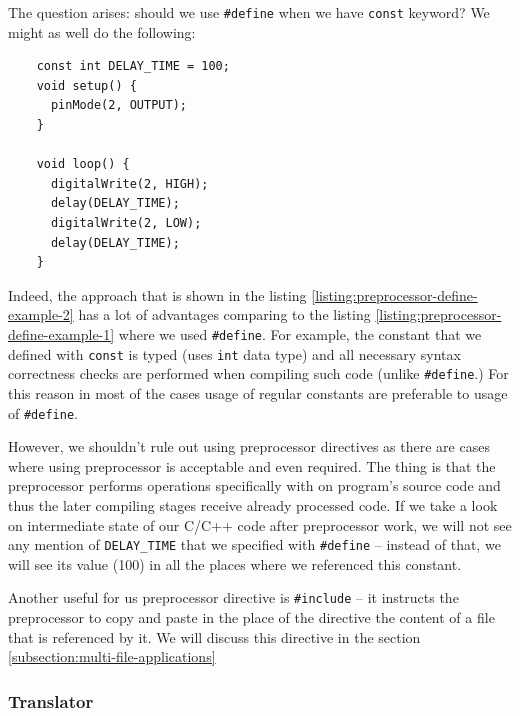\documentclass[../sparc.tex]{subfiles}
\begin{document}
The question arises: should we use \texttt{#define} when we have
\texttt{const} keyword?  We might as well do the following:

\begin{listing}[H]
  \begin{verbatim}
    const int DELAY_TIME = 100;
    void setup() {
      pinMode(2, OUTPUT);
    }

    void loop() {
      digitalWrite(2, HIGH);
      delay(DELAY_TIME);
      digitalWrite(2, LOW);
      delay(DELAY_TIME);
    }
  \end{verbatim}
  \label{listing:preprocessor-define-example-2}
  \caption{An example of specifying a regular constant.}
\end{listing}

Indeed, the approach that is shown in the listing
\ref{listing:preprocessor-define-example-2} has a lot of advantages comparing to
the listing \ref{listing:preprocessor-define-example-1} where we used
\texttt{#define}.  For example, the constant that we defined with
\texttt{const} is typed (uses \texttt{int} data type) and all
necessary syntax correctness checks are performed when compiling such code
(unlike \texttt{#define}.)  For this reason in most of the cases usage
of regular constants are preferable to usage of \texttt{#define}.

However, we shouldn't rule out using preprocessor directives as there are cases
where using preprocessor is acceptable and even required.  The thing is that the
preprocessor performs operations specifically with on program's source code and
thus the later compiling stages receive already processed code.  If we take a
look on intermediate state of our C/C++ code after preprocessor work, we will
not see any mention of \texttt{DELAY_TIME} that we specified with
\texttt{#define} -- instead of that, we will see its value (100) in all
the places where we referenced this constant.

Another useful for us preprocessor directive is \texttt{#include} -- it
instructs the preprocessor to copy and paste in the place of the directive the
content of a file that is referenced by it.  We will discuss this directive in
the section \ref{subsection:multi-file-applications}

\subsubsection{Translator}
\end{document}
